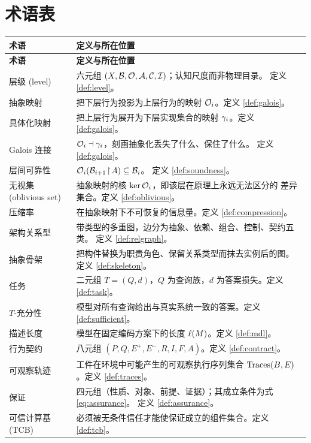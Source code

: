 \chapter{术语表}\label{app:glossary}

\begin{longtable}{L{3.4cm}L{11.0cm}}
\toprule
\textbf{术语} & \textbf{定义与所在位置} \\
\midrule
\endfirsthead
\toprule
\textbf{术语} & \textbf{定义与所在位置} \\
\midrule
\endhead
\bottomrule
\endlastfoot
层级 (level) & 六元组 $(X, \mathcal{B}, \mathcal{O}, \mathcal{A}, \mathcal{C}, \mathcal{I})$；认知尺度而非物理目录。
  定义 \ref{def:level}。 \\
抽象映射 & 把下层行为投影为上层行为的映射 $\mathcal{O}_i$。定义 \ref{def:galois}。 \\
具体化映射 & 把上层行为展开为下层实现集合的映射 $\gamma_i$。定义 \ref{def:galois}。 \\
Galois 连接 & $\mathcal{O}_i \dashv \gamma_i$，刻画抽象化丢失了什么、保住了什么。
  定义 \ref{def:galois}。 \\
层间可靠性 & $\mathcal{O}_i(\mathcal{B}_{i+1}\!\upharpoonright\!A) \subseteq \mathcal{B}_i$。
  定义 \ref{def:soundness}。 \\
无视集 (oblivious set) & 抽象映射的核 $\operatorname{ker} \mathcal{O}_i$，即该层在原理上永远无法区分的
  差异集合。定义 \ref{def:oblivious}。 \\
压缩率 & 在抽象映射下不可恢复的信息量。定义 \ref{def:compression}。 \\
架构关系型 & 带类型的多重图，边分为抽象、依赖、组合、控制、契约五类。
  定义 \ref{def:relgraph}。 \\
抽象骨架 & 把构件替换为职责角色、保留关系类型而抹去实例后的图。定义
  \ref{def:skeleton}。 \\
任务 & 二元组 $T = (Q, d)$，$Q$ 为查询族，$d$ 为答案损失。定义
  \ref{def:task}。 \\
$T$-充分性 & 模型对所有查询给出与真实系统一致的答案。定义 \ref{def:sufficient}。 \\
描述长度 & 模型在固定编码方案下的长度 $\ell(M)$。定义 \ref{def:mdl}。 \\
行为契约 & 八元组 $(P, Q, E^{+}, E^{-}, R, I, F, A)$。定义 \ref{def:contract}。 \\
可观察轨迹 & 工件在环境中可能产生的可观察执行序列集合 $\operatorname{Traces}(B,E)$。定义
  \ref{def:traces}。 \\
保证 & 四元组（性质、对象、前提、证据）；其成立条件为式 \eqref{eq:assurance}。
  定义 \ref{def:assurance}。 \\
可信计算基 (TCB) & 必须被无条件信任才能使保证成立的组件集合。定义 \ref{def:tcb}。 \\

\end{longtable}

